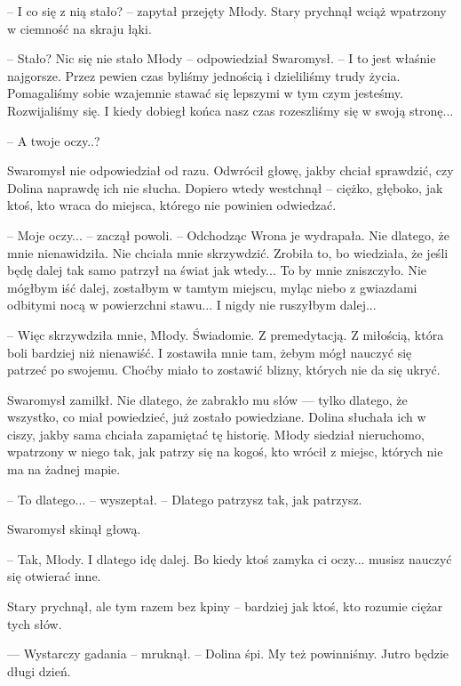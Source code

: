 \par\noindent-- I co się z nią stało? -- zapytał przejęty Młody. Stary prychnął wciąż wpatrzony w ciemność na skraju łąki.
\par\noindent-- Stało? Nic się nie stało Młody -- odpowiedział Swaromysł. -- I to jest właśnie najgorsze. Przez pewien czas byliśmy jednością i dzieliliśmy trudy życia. Pomagaliśmy sobie wzajemnie stawać się lepszymi w tym czym jesteśmy. Rozwijaliśmy się. I kiedy dobiegł końca nasz czas rozeszliśmy się w swoją stronę...
\par\noindent-- A twoje oczy..?
\par\indent Swaromysł nie odpowiedział od razu. Odwrócił głowę, jakby chciał sprawdzić, czy Dolina naprawdę ich nie słucha. Dopiero wtedy westchnął -- ciężko, głęboko, jak ktoś, kto wraca do miejsca, którego nie powinien odwiedzać. 
\par\noindent-- Moje oczy... -- zaczął powoli. -- Odchodząc Wrona je wydrapała. Nie dlatego, że mnie nienawidziła. Nie chciała mnie skrzywdzić. Zrobiła to, bo wiedziała, że jeśli będę dalej tak samo patrzył na świat jak wtedy... To by mnie zniszczyło. Nie mógłbym iść dalej, zostałbym w tamtym miejscu, myląc niebo z gwiazdami odbitymi nocą w powierzchni stawu... I nigdy nie ruszyłbym dalej... 
\par\noindent-- Więc skrzywdziła mnie, Młody. Świadomie. Z premedytacją. Z miłością, która boli bardziej niż nienawiść. I zostawiła mnie tam, żebym mógł nauczyć się patrzeć po swojemu. Choćby miało to zostawić blizny, których nie da się ukryć.
\par\indent Swaromysł zamilkł. Nie dlatego, że zabrakło mu słów — tylko dlatego, że wszystko, co miał powiedzieć, już zostało powiedziane. Dolina słuchała ich w ciszy, jakby sama chciała zapamiętać tę historię. Młody siedział nieruchomo, wpatrzony w niego tak, jak patrzy się na kogoś, kto wrócił z miejsc, których nie ma na żadnej mapie.
\par\noindent-- To dlatego... -- wyszeptał. -- Dlatego patrzysz tak, jak patrzysz.
\par\noindent Swaromysł skinął głową.
\par\noindent-- Tak, Młody. I dlatego idę dalej. Bo kiedy ktoś zamyka ci oczy... musisz nauczyć się otwierać inne.
\par\noindent Stary prychnął, ale tym razem bez kpiny -- bardziej jak ktoś, kto rozumie ciężar tych słów.
\par\noindent--- Wystarczy gadania -- mruknął. -- Dolina śpi. My też powinniśmy. Jutro będzie długi dzień.
